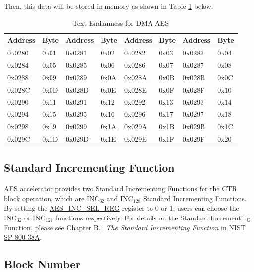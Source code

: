 \documentclass[main\_\_EN.tex]{subfiles}
\begin{document}
Then, this data will be stored in memory as shown in Table \ref{tab:aes-dma-aes-plaintext-ciphertext-endian} below.

\begin{longtable}[c]
{ | l | l |l | l | l | l | l | l |}
\caption{Text Endianness for DMA-AES} 
\label{tab:aes-dma-aes-plaintext-ciphertext-endian}\\
\hline
\rowcolor{lightgray}
\textbf{Address} &  \textbf{Byte}  & \textbf{Address} &  \textbf{Byte}  & \textbf{Address} &  \textbf{Byte}  & \textbf{Address} &  \textbf{Byte} \\\hline
0x0280 & 0x01 & 0x0281 & 0x02 & 0x0282 & 0x03 & 0x0283 & 0x04 \\\hline
0x0284 & 0x05 & 0x0285 & 0x06 & 0x0286 & 0x07 & 0x0287 & 0x08 \\\hline
0x0288 & 0x09 & 0x0289 & 0x0A & 0x028A & 0x0B & 0x028B & 0x0C \\\hline
0x028C & 0x0D & 0x028D & 0x0E & 0x028E & 0x0F & 0x028F & 0x10 \\\hline
0x0290 & 0x11 & 0x0291 & 0x12 & 0x0292 & 0x13 & 0x0293 & 0x14 \\\hline
0x0294 & 0x15 & 0x0295 & 0x16 & 0x0296 & 0x17 & 0x0297 & 0x18 \\\hline
0x0298 & 0x19 & 0x0299 & 0x1A & 0x029A & 0x1B & 0x029B & 0x1C \\\hline
0x029C & 0x1D & 0x029D & 0x1E & 0x029E & 0x1F & 0x029F & 0x20 \\\hline
\end{longtable}
\subsection{Standard Incrementing Function}\label{sec:aes-Standard-Incrementing-Function}

AES accelerator provides two Standard Incrementing Functions for the CTR block operation, which are INC$_{32}$ and INC$_{128}$ Standard Incrementing Functions. By setting the  \hyperref[regdesc:AESINCSELREG]{AES\_INC\_SEL\_REG} register to 0 or 1, users can choose the INC$_{32}$ or INC$_{128}$ functions respectively. For details on the Standard Incrementing Function, please see Chapter B.1 \textit{The Standard Incrementing Function} in \href{https://nvlpubs.nist.gov/nistpubs/Legacy/SP/nistspecialpublication800-38a.pdf}{NIST SP 800-38A}.

\subsection{Block Number}\label{sec:aes-block-number}
\end{document}
